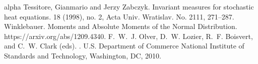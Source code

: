 \documentclass{article}
\numberwithin{equation}{section}
\begin{document}
\begin{small}
\begin{thebibliography}{alpha}
		Tessitore, Gianmario and Jerzy Zabczyk.
		\newblock Invariant measures for stochastic heat equations.
		 18 (1998), no. 2, Acta Univ. Wratislav. No. 2111, 271--287.
		Winklebauer.
		\newblock Moments and Absolute Moments of the
		Normal Distribution.
		 https://arxiv.org/abs/1209.4340.
    F.~W.~J. Olver, D.~W. Lozier, R.~F. Boisvert, and C.~W. Clark (eds).
    .
    \newblock U.S. Department of Commerce National Institute of Standards and
      Technology, Washington, DC, 2010.
	\end{thebibliography}
\end{small}
\end{document}
